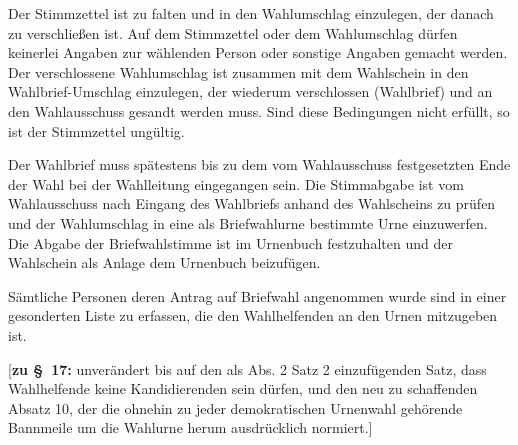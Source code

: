 \documentclass[%
draft,%
multilinesections%
]{fswo}
\newcommand\bemFr[1] {{\color{Red}[#1]}}
\newcommand\bemFr[1]{}%
\begin{document}
\begin{contract}
Der Stimmzettel ist zu falten und in den Wahlumschlag einzulegen, der danach zu verschließen ist.
Auf dem Stimmzettel oder dem Wahlumschlag dürfen keinerlei Angaben zur wählenden Person oder sonstige Angaben gemacht werden.
Der verschlossene Wahlumschlag ist zusammen mit dem Wahlschein in den Wahlbrief-Umschlag einzulegen, der wiederum verschlossen (Wahlbrief) und an den Wahlausschuss gesandt werden muss.
Sind diese Bedingungen nicht erfüllt, so ist der Stimmzettel ungültig.

Der Wahlbrief muss spätestens bis zu dem vom Wahlausschuss festgesetzten Ende der Wahl bei der Wahlleitung eingegangen sein.
Die Stimmabgabe ist vom Wahlausschuss nach Eingang des Wahlbriefs anhand des Wahlscheins zu prüfen und der Wahlumschlag in eine als Briefwahlurne bestimmte Urne einzuwerfen.
Die Abgabe der Briefwahlstimme ist im Urnenbuch festzuhalten und der Wahlschein als Anlage dem Urnenbuch beizufügen.

Sämtliche Personen deren Antrag auf Briefwahl angenommen wurde sind in einer gesonderten Liste zu erfassen, die den Wahlhelfenden an den Urnen mitzugeben ist.
\end{contract}

\bemFr{\textbf{zu \S~17:} unverändert bis auf den als Abs. 2 Satz 2 einzufügenden Satz, dass Wahlhelfende keine Kandidierenden sein dürfen, und den neu zu schaffenden Absatz 10, der die ohnehin zu jeder demokratischen Urnenwahl gehörende Bannmeile um die Wahlurne herum ausdrücklich normiert.}
\end{document}
